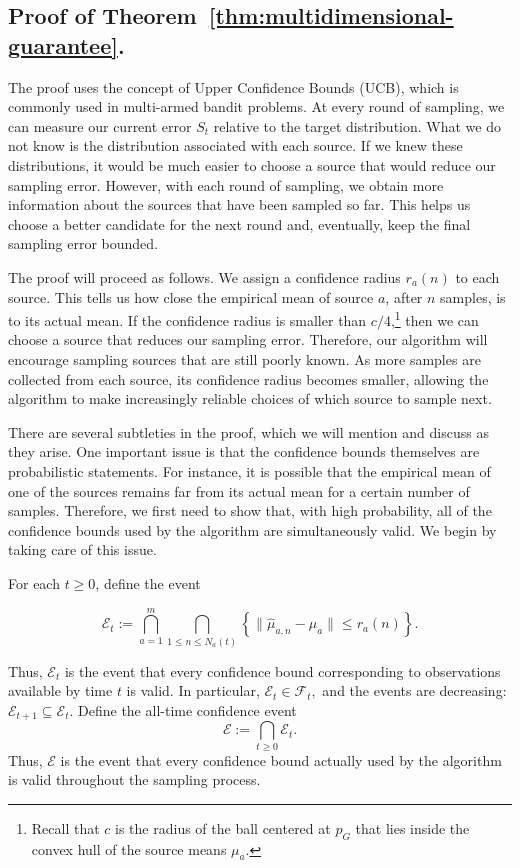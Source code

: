 \documentclass[twoside]{article}
\begin{document}
\subsection{Proof of Theorem~\ref{thm:multidimensional-guarantee}.}

The proof uses the concept of Upper Confidence Bounds (UCB), which is commonly
used in multi-armed bandit problems. At every round of sampling, we can measure
our current error \(S_t\) relative to the target distribution. What we do not
know is the distribution associated with each source. If we knew these
distributions, it would be much easier to choose a source that would reduce our
sampling error. However, with each round of sampling, we obtain more information
about the sources that have been sampled so far. This helps us choose a better
candidate for the next round and, eventually, keep the final sampling error
bounded.

The proof will proceed as follows. We assign a confidence radius \(r_a(n)\) to
each source. This tells us how close the empirical mean of source \(a\), after \(n\)
samples, is to its actual mean. If the confidence radius is smaller than
\(c/4\),\footnote{Recall that \(c\) is the radius of the ball centered at
\(p_G\) that lies inside the convex hull of the source means \(\mu_a\).} then we
can choose a source that reduces our sampling error. Therefore, our algorithm will
encourage sampling sources that are still poorly known. As more samples are
collected from each source, its confidence radius becomes smaller, allowing the
algorithm to make increasingly reliable choices of which source to sample next.

There are several subtleties in the proof, which we will mention and discuss as
they arise. One important issue is that the confidence bounds themselves are
probabilistic statements. For instance, it is possible that the empirical mean
of one of the sources remains far from its actual mean for a certain number of
samples. Therefore, we first need to show that, with high probability, all of
the confidence bounds used by the algorithm are simultaneously valid. We begin
by taking care of this issue.


For each \(t\geq 0\), define the event

$$
\mathcal E_t
:=
\bigcap_{a=1}^m
\bigcap_{1\le n\le N_a(t)}
\left\{
\|\widehat\mu_{a,n}-\mu_a\|
\le
r_a(n)
\right\}.
$$

Thus, \(\mathcal E_t\) is the event that every confidence bound corresponding
to observations available by time \(t\) is valid. In particular,  $
\mathcal E_t\in\mathcal F_t,
$
and the events are decreasing: 
$
\mathcal E_{t+1}\subseteq\mathcal E_t.
$
Define the all-time confidence event
\[
\mathcal E
:=
\bigcap_{t\ge0}\mathcal E_t.
\]
Thus, \(\mathcal E\) is the event that every confidence bound actually used
by the algorithm is valid throughout the sampling process.
\end{document}
